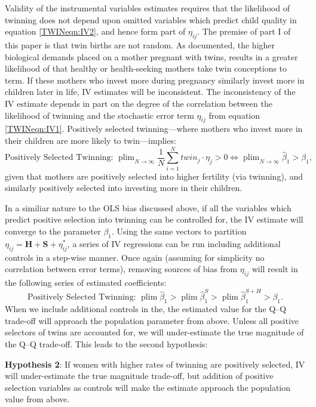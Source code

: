 \documentclass[subeqn]{article}
\DeclareMathOperator{\plim}{plim}
\begin{document}
\begin{spacing}{1.4}
Validity of the instrumental variables estimates requires that the likelihood
of twinning does not depend upon omitted variables which predict child quality
in equation \ref{TWINeqn:IV2}, and hence form part of $\eta_{ij}$.  The premise
of part I of this paper is that twin births are not random. As documented, the
higher biological demands placed on a mother pregnant with twins, results in a
greater likelihood of that healthy or health-seeking mothers take twin
conceptions to term.  If these mothers who invest more during pregnancy similarly
invest more in children later in life, IV estimates will be inconsistent. The
inconsistency of the IV estimate depends in part on the degree of the correlation
between the likelihood of twinning and the stochastic error term $\eta_{ij}$ from
equation \ref{TWINeqn:IV1}.  Positively selected twinning---where mothers who
invest more in their children are more likely to twin---implies:
\begin{equation}
  \text{Positively Selected Twinning:\ \ \ }  \plim_{N\rightarrow\infty} \frac{1}{N}\sum_{i=1}^Ntwin_j\cdot \eta_j > 0 \Leftrightarrow \plim_{N\rightarrow\infty}\hat\beta_1 > \beta_1, \nonumber
\end{equation}
given that mothers are positively selected into higher fertility (via twinning),
and similarly positively selected into investing more in their children.

In a similiar nature to the OLS bias discussed above, if all the variables
which predict positive selection into twinning can be controlled for, the
IV estimate will converge to the parameter $\beta_1$.  Using the same vectors
to partition $\eta_{ij}=\bm{H}+\bm{S}+\eta^*_{ij}$, a series of IV regressions
can be run including additional controls in a step-wise manner.  Once again
(assuming for simplicity no correlation between error terms), removing sources
of bias from $\eta_{ij}$ will result in the following series of estimated
coefficients:
\begin{equation}
  \text{Positively Selected Twinning:\ \ \ } \plim \hat\beta_1 > \plim\hat\beta_1^{S} > \plim\hat\beta_1^{S+H} > \beta_1. \nonumber
\end{equation}
When we include additional controls in the, the estimated value for the Q--Q
trade-off will approach the population parameter from above.  Unless all
positive selectors of twins are accounted for, we will under-estimate the
true magnitude of the Q--Q trade-off. This leads to the second hypothesis:

\noindent \textbf{Hypothesis 2}: If women with higher rates of twinning are
positively selected, IV will under-estimate the true magnitude trade-off, but
addition of positive selection variables as controls will make the estimate
approach the population value from above.



\end{spacing}
\end{document}

